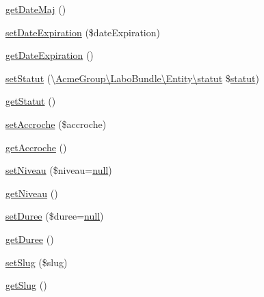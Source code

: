 \begin{DoxyCompactItemize}
\item 
\hyperlink{class_acme_group_1_1_labo_bundle_1_1_entity_1_1fiche_creative_a0c115457cfe9789c7634f97b1dd234f8}{get\+Date\+Maj} ()
\item 
\hyperlink{class_acme_group_1_1_labo_bundle_1_1_entity_1_1fiche_creative_aace9ec55fbfd7db5a623d8b84d3a7967}{set\+Date\+Expiration} (\$date\+Expiration)
\item 
\hyperlink{class_acme_group_1_1_labo_bundle_1_1_entity_1_1fiche_creative_a31c7b7060f1cc54806cda7ce76d466f1}{get\+Date\+Expiration} ()
\item 
\hyperlink{class_acme_group_1_1_labo_bundle_1_1_entity_1_1fiche_creative_ad7063f8895910c0ddde48550fe684dfd}{set\+Statut} (\textbackslash{}\hyperlink{class_acme_group_1_1_labo_bundle_1_1_entity_1_1statut}{Acme\+Group\textbackslash{}\+Labo\+Bundle\textbackslash{}\+Entity\textbackslash{}statut} \$\hyperlink{class_acme_group_1_1_labo_bundle_1_1_entity_1_1statut}{statut})
\item 
\hyperlink{class_acme_group_1_1_labo_bundle_1_1_entity_1_1fiche_creative_ab0788b73bfa461bbd85a5fd884370c0f}{get\+Statut} ()
\item 
\hyperlink{class_acme_group_1_1_labo_bundle_1_1_entity_1_1fiche_creative_ade70e334c7b88cc7cf6731f915637223}{set\+Accroche} (\$accroche)
\item 
\hyperlink{class_acme_group_1_1_labo_bundle_1_1_entity_1_1fiche_creative_acad837e8b5fdcf8b3685b27537057e70}{get\+Accroche} ()
\item 
\hyperlink{class_acme_group_1_1_labo_bundle_1_1_entity_1_1fiche_creative_aec369f56c69103dec3d3309b0bf53e53}{set\+Niveau} (\$niveau=\hyperlink{validate_8js_afb8e110345c45e74478894341ab6b28e}{null})
\item 
\hyperlink{class_acme_group_1_1_labo_bundle_1_1_entity_1_1fiche_creative_a7d0b8582e32c15f11e3c9f14cab8cd0a}{get\+Niveau} ()
\item 
\hyperlink{class_acme_group_1_1_labo_bundle_1_1_entity_1_1fiche_creative_aae6c32401f551feccf36432a1447ba78}{set\+Duree} (\$duree=\hyperlink{validate_8js_afb8e110345c45e74478894341ab6b28e}{null})
\item 
\hyperlink{class_acme_group_1_1_labo_bundle_1_1_entity_1_1fiche_creative_a8853f5ba692cdbaf48fb4b492a2b3258}{get\+Duree} ()
\item 
\hyperlink{class_acme_group_1_1_labo_bundle_1_1_entity_1_1fiche_creative_ac7be933eb38c837f9585c0693d450a66}{set\+Slug} (\$slug)
\item 
\hyperlink{class_acme_group_1_1_labo_bundle_1_1_entity_1_1fiche_creative_a5f935b05b27f1536a34ce425c86b7881}{get\+Slug} ()

\end{DoxyCompactItemize}
